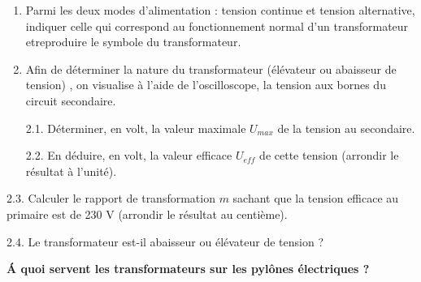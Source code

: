 \documentclass[11pt,a4paper]{article}
\newcommand{\cadreblanc}[1]{%
\medskip\framebox[\linewidth][c]{%
\rule{0mm}{#1mm}}\par
\medskip}
\begin{document}
\begin{enumerate}
    \item Parmi les deux modes d'alimentation : tension continue et tension alternative, indiquer celle qui correspond au fonctionnement normal d'un transformateur etreproduire le symbole du transformateur. 

    \vspace{2mm}

    \cadreblanc{10}


\item Afin de déterminer la nature du transformateur (élévateur ou abaisseur de tension) , on visualise à l'aide de l'oscilloscope, la tension aux bornes du circuit secondaire. 


\noindent%
\begin{minipage}{.55\textwidth}%

    2.1. Déterminer, en volt, la valeur maximale $U_{max}$ de la tension au secondaire. 

    \cadreblanc{10}

    2.2. En déduire, en volt, la valeur efficace $U_{eff}$ de cette tension (arrondir le résultat à l'unité). 

    \cadreblanc{15}
\end{minipage}%
\hfill
\begin{minipage}{.35\textwidth}%
\osci[%
scale=0.5,
second channel=0,
screen offset one=0,
screen offset two=0,
time div=5,
voltage div one=5,
voltage div two=2,
sample rate=200,
xy mode=0,
func one=12*sin(2*180/0.020*x),
func two=3*sin(2*180/0.020*x+180),
color one=D62626,
color two=1053AF,
graph back color=FFFFFF,
info back color=D6D6D6,
info text color=000000,
main axis color=000000,
grid color=CCCCCC
]
\end{minipage}%

\end{enumerate}

\newpage 

2.3. Calculer le rapport de transformation $m$ sachant que la tension efficace au primaire est de 230 V (arrondir le résultat au centième). 

\cadreblanc{15}

2.4. Le transformateur est-il abaisseur ou élévateur de tension ?
\vspace{5mm}

\dotfill 






\begin{center}
    
\textbf{\'A quoi servent les transformateurs sur les pylônes électriques ? }
\end{center}
\noindent%
\end{document}
